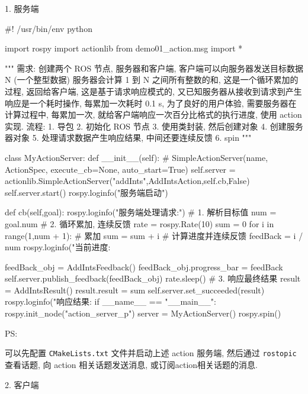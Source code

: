 \documentclass[openany, fontset=windowsold]{ctexbook}
\theoremstyle{kaiti}
\theoremstyle{normal}
\begin{document}
1. 服务端

\begin{python}
  #! /usr/bin/env python

  import rospy
  import actionlib
  from demo01_action.msg import *

  """
      需求:
          创建两个 ROS 节点, 服务器和客户端, 
          客户端可以向服务器发送目标数据 N (一个整型数据) 服务器会计算 1 到 N 之间所有整数的和,
          这是一个循环累加的过程, 返回给客户端, 这是基于请求响应模式的, 
          又已知服务器从接收到请求到产生响应是一个耗时操作, 每累加一次耗时 0.1 s, 
          为了良好的用户体验, 需要服务器在计算过程中, 
          每累加一次, 就给客户端响应一次百分比格式的执行进度, 使用 action 实现.
      流程:
          1. 导包
          2. 初始化 ROS 节点
          3. 使用类封装, 然后创建对象
          4. 创建服务器对象
          5. 处理请求数据产生响应结果, 中间还要连续反馈
          6. spin
  """

  class MyActionServer:
      def __init__(self):
          # SimpleActionServer(name, ActionSpec, execute_cb=None, auto_start=True)
          self.server = actionlib.SimpleActionServer("addInts",AddIntsAction,self.cb,False)
          self.server.start()
          rospy.loginfo("服务端启动")

      def cb(self,goal):
          rospy.loginfo("服务端处理请求:")
          # 1. 解析目标值
          num = goal.num
          # 2. 循环累加, 连续反馈
          rate = rospy.Rate(10)
          sum = 0
          for i in range(1,num + 1):
              # 累加
              sum = sum + i
              # 计算进度并连续反馈
              feedBack = i / num
              rospy.loginfo("当前进度:%

              feedBack_obj = AddIntsFeedback()
              feedBack_obj.progress_bar = feedBack
              self.server.publish_feedback(feedBack_obj)
              rate.sleep()
          # 3. 响应最终结果
          result = AddIntsResult()
          result.result = sum        
          self.server.set_succeeded(result)
          rospy.loginfo("响应结果:%
  if __name__ == "__main__":
      rospy.init_node("action_server_p")
      server = MyActionServer()
      rospy.spin()
\end{python}

PS:

可以先配置 \verb|CMakeLists.txt| 文件并启动上述 action 服务端, 然后通过 \verb|rostopic| 查看话题, 向 action 相关话题发送消息, 或订阅action相关话题的消息.

2. 客户端
\end{document}
